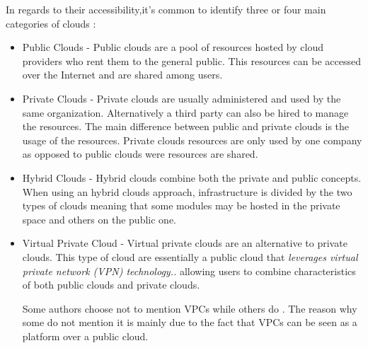         In regards to their accessibility,it's common to identify three or four main categories of clouds \cite{Zhang2010,Garrison2012,Garrison2012,Khajeh-Hosseini2012} :
        	\begin{itemize}
            	\item{Public Clouds} - Public clouds are a pool of resources hosted by cloud providers who rent them to the general public. This resources can be accessed over the Internet and are shared among users. 
                
				\item{Private Clouds} - Private clouds are usually administered and used by the same organization. Alternatively a third party can also be hired to manage the resources. The main difference between public and private clouds is the usage of the resources. Private clouds resources are only used by one company as opposed to public clouds were resources are shared.

                \item{Hybrid Clouds} - Hybrid clouds combine both the private and public concepts. When using an hybrid clouds approach, infrastructure is divided by the two types of clouds meaning that some modules may be hosted in the private space and others on the public one.
                
                \item{Virtual Private Cloud} - Virtual private clouds are an alternative to private clouds. This type of cloud are essentially a public cloud that \textit{leverages virtual private network (VPN) technology..}\cite{Zhang2010} allowing users to combine characteristics of both public clouds and private clouds. 
                
                Some authors choose not to mention VPCs \cite{Garrison2012,Garrison2012,Khajeh-Hosseini2012} while others do \cite{Zhang2010}. The reason why some do not mention it is mainly due to the fact that VPCs can be seen as a platform over a public cloud. 
                
			\end{itemize}
        
